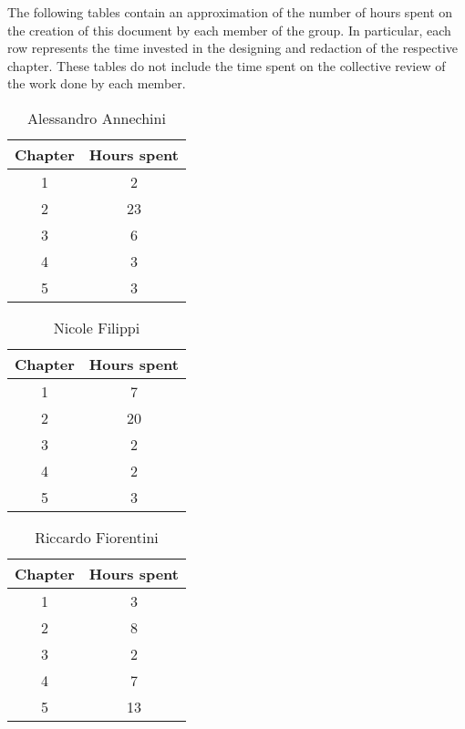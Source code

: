 The following tables contain an approximation of the number of hours spent on the creation of this document by each member of the group. In particular, each row represents the time invested in the designing and redaction of the respective chapter. These tables do not include the time spent on the collective review of the work done by each member.

\begin{table}[h!]
  \centering
  \begin{tabular}{|c|c|}
    \hline
    Chapter & Hours spent \\
    \hline
    1 & 2\\
    \hline
    2 & 23\\
    \hline
    3 & 6\\
    \hline
    4 & 3\\
    \hline
    5 & 3\\
    \hline
  \end{tabular}
  \caption{Alessandro Annechini}
  \label{tab:Alessandro_Annechini_hours}
\end{table}

\begin{table}[h!]
  \centering
  \begin{tabular}{|c|c|}
    \hline
    Chapter & Hours spent \\
    \hline
    1 & 7\\
    \hline
    2 & 20\\
    \hline
    3 & 2\\
    \hline
    4 & 2\\
    \hline
    5 & 3\\
    \hline
  \end{tabular}
  \caption{Nicole Filippi}
  \label{tab:Nicole_Filippi_hours}
\end{table}

\begin{table}[h!]
  \centering
  \begin{tabular}{|c|c|}
    \hline
    Chapter & Hours spent \\
    \hline
    1 & 3\\
    \hline
    2 & 8\\
    \hline
    3 & 2\\
    \hline
    4 & 7\\
    \hline
    5 & 13\\
    \hline
  \end{tabular}
  \caption{Riccardo Fiorentini}
  \label{tab:Riccardo_Fiorentini_hours}
\end{table}